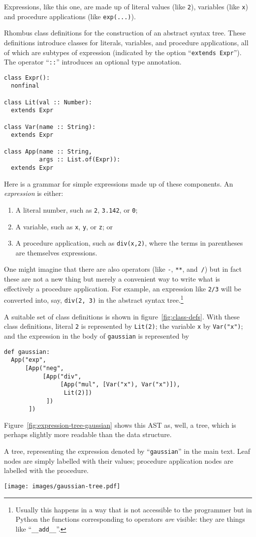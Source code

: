 \documentclass[11pt, a4paper]{article}
\newcommand{\cd}[1]{\texttt{#1}}
\begin{document}
Expressions, like this one, are made up of literal values (like
\cd{2}), variables (like \cd{x}) and procedure applications (like
\cd{exp(...)}). 
\begin{marginfigure}
  \caption{Rhombus class definitions for the construction of an
    abstract syntax tree. These definitions introduce classes for
    literals, variables, and procedure applications, all of which are
    subtypes of expression (indicated by the option ``\cd{extends
      Expr}''). The operator ``\cd{::}'' introduces an optional type
    annotation.\label{fig:class-defs}}\footnotesize
\begin{verbatim}
class Expr():
  nonfinal

class Lit(val :: Number):
  extends Expr

class Var(name :: String):
  extends Expr

class App(name :: String,
          args :: List.of(Expr)):
  extends Expr
\end{verbatim}
\end{marginfigure}
Here is a grammar for simple expressions made up of these
components. An \emph{expression} is either:
\begin{enumerate}
\item A literal number, such as \cd{2}, \cd{3.142}, or \cd{0};
\item A variable, such as \cd{x}, \cd{y}, or \cd{z}; or
\item A procedure application, such as \cd{div(x,2)}, where the terms
  in parentheses are themselves expressions.
\end{enumerate}
One might imagine that there are also operators (like
\cd{-}, \cd{**}, and~\cd{/}) but in fact these are not a new thing but
merely a convenient way to write what is effectively a procedure
application. For example, an expression like \cd{2/3} will be
converted into, say, \cd{div(2, 3)} in the abstract syntax
tree.\footnote{Usually this happens in a way that is not accessible to
  the programmer but in Python the functions corresponding to
  operators \emph{are} visible: they are things like
  ``\cd{__add__}''.}

A suitable set of class definitions is shown in
figure~\ref{fig:class-defs}. With these class definitions, literal
\cd{2} is represented by \cd{Lit(2)}; the variable \cd{x} by
\cd{Var("x")}; and the expression in the body of \cd{gaussian} is
represented by
\begin{verbatim}
def gaussian:
  App("exp",
      [App("neg",
           [App("div",
                [App("mul", [Var("x"), Var("x")]),
                 Lit(2)])
            ])
       ])
\end{verbatim}
Figure~\ref{fig:expression-tree-gaussian} shows this AST as, well, a
tree, which is perhaps slightly more readable than the data structure.
 \begin{marginfigure}
  \caption{A tree, representing the expression denoted by
    ``\cd{gaussian}'' in the main text. Leaf nodes are simply
    labelled with their values; procedure application nodes are
    labelled with the procedure.\label{fig:expression-tree-gaussian}}
  \centering
  \texttt{[image: images/gaussian-tree.pdf]}
\end{marginfigure}
\end{document}
